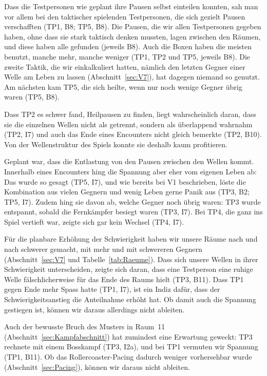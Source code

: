 \documentclass[../Main.tex]{subfiles}
\begin{document}
Dass die Testpersonen wie geplant ihre Pausen selbst einteilen konnten, sah man vor allem bei den taktischer spielenden Testpersonen, die sich gezielt Pausen verschafften (TP1, B8; TP5, B8). Die Pausen, die wir allen Testpersonen gegeben haben, ohne dass sie stark taktisch denken mussten, lagen zwischen den Räumen, und diese haben alle gefunden (jeweils B8). Auch die Boxen haben die meisten benutzt, manche mehr, manche weniger (TP1, TP2 und TP5, jeweils B8). Die zweite Taktik, die wir einkalkuliert hatten, nämlich den letzten Gegner einer Welle am Leben zu lassen (Abschnitt~\ref{sec:V7}), hat dagegen niemand so genutzt. Am nächsten kam TP5, die sich heilte, wenn nur noch wenige Gegner übrig waren (TP5, B8).

Dass TP2 es schwer fand, Heilpausen zu finden, liegt wahrscheinlich daran, dass sie die einzelnen Wellen nicht als getrennt, sondern als überlappend wahrnahm (TP2, I7) und auch das Ende eines Encounters nicht gleich bemerkte (TP2, B10). Von der Wellenstruktur des Spiels konnte sie deshalb kaum profitieren.

Geplant war, dass die Entlastung von den Pausen zwischen den Wellen kommt. Innerhalb eines Encounters hing die Spannung aber eher vom eigenen Leben ab: Das wurde so gesagt (TP5, I7), und wie bereits bei V1 beschrieben, löste die Kombination aus vielen Gegnern und wenig Leben gerne Panik aus (TP3, B2; TP5, I7). Zudem hing sie davon ab, welche Gegner noch übrig waren: TP3 wurde entspannt, sobald die Fernkämpfer besiegt waren (TP3, I7). Bei TP4, die ganz ins Spiel vertieft war, zeigte sich gar kein Wechsel (TP4, I7).

Für die planbare Erhöhung der Schwierigkeit haben wir unsere Räume nach und nach schwerer gemacht, mit mehr und mit schwereren Gegnern (Abschnitt~\ref{sec:V7} und Tabelle~\ref{tab:Raeume}). Dass sich unsere Wellen in ihrer Schwierigkeit unterscheiden, zeigte sich daran, dass eine Testperson eine ruhige Welle fälschlicherweise für das Ende des Raums hielt (TP3, B11). Dass TP1 gegen Ende mehr Spass hatte (TP1, I7), ist ein Indiz dafür, dass der Schwierigkeitsanstieg die Anteilnahme erhöht hat. Ob damit auch die Spannung gestiegen ist, können wir daraus allerdings nicht ableiten.

Auch der bewusste Bruch des Musters in Raum~11 (Abschnitt~\ref{sec:Kampfabschnitt}) hat zumindest eine Erwartung geweckt: TP3 rechnete mit einem Bosskampf (TP3, I2a), und bei TP1 vermuten wir Spannung (TP1, B11). Ob das Rollercoaster-Pacing dadurch weniger vorhersehbar wurde (Abschnitt~\ref{sec:Pacing}), können wir daraus nicht ableiten.
\end{document}
